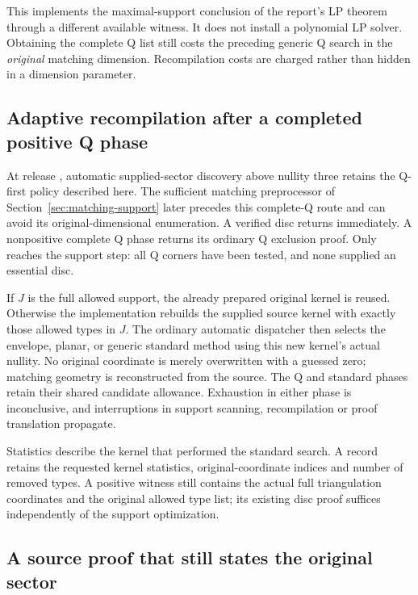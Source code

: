 This implements the maximal-support conclusion of the report's LP theorem
through a different available witness. It does not install a polynomial LP
solver. Obtaining the complete Q list still costs the preceding generic
Q search in the \emph{original} matching dimension. Recompilation costs are
charged rather than hidden in a dimension parameter.

\subsection{Adaptive recompilation after a completed positive Q phase}

At release , automatic supplied-sector discovery above
nullity three retains the Q-first policy described here. The sufficient
matching preprocessor of Section~\ref{sec:matching-support} later precedes
this complete-Q route and can avoid its original-dimensional enumeration. A verified disc returns immediately. A nonpositive complete
Q phase returns its ordinary Q exclusion proof. Only
 reaches the support step: all Q corners have
been tested, and none supplied an essential disc.

If $J$ is the full allowed support, the already prepared original kernel
is reused. Otherwise the implementation rebuilds the supplied source kernel
with exactly those allowed types in $J$. The ordinary automatic dispatcher
then selects the envelope, planar, or generic standard method using this
new kernel's actual nullity. No original coordinate is merely overwritten
with a guessed zero; matching geometry is reconstructed from the source.
The Q and standard phases retain their shared candidate allowance.
Exhaustion in either phase is inconclusive, and interruptions in support
scanning, recompilation or proof translation propagate.

Statistics describe the kernel that performed the standard search. A
 record retains the requested kernel statistics,
original-coordinate indices and number of removed types. A positive witness
still contains the actual full triangulation coordinates and the original
allowed type list; its existing disc proof suffices independently of the
support optimization.

\subsection{A source proof that still states the original sector}

